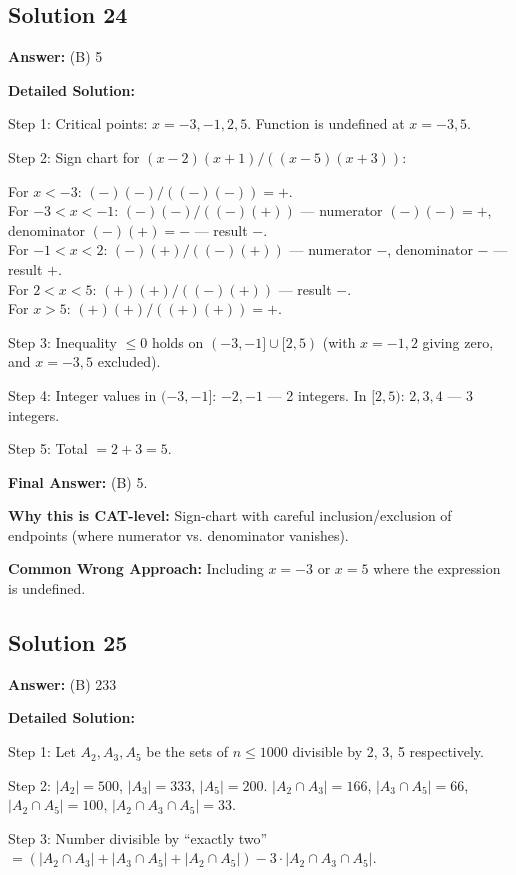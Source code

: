 \documentclass[11pt]{article}
\begin{document}
\subsection*{Solution 24}
\textbf{Answer:} (B) 5

\textbf{Detailed Solution:}

Step 1: Critical points: $x = -3, -1, 2, 5$. Function is undefined at $x = -3, 5$.

Step 2: Sign chart for $(x-2)(x+1)/((x-5)(x+3))$:

For $x < -3$: $(-)(-)/((-)(-)) = +$. \\
For $-3 < x < -1$: $(-)(-)/((-)(+))$ — numerator $(-)(-) = +$, denominator $(-)(+) = -$ — result $-$. \\
For $-1 < x < 2$: $(-)(+)/((-)(+))$ — numerator $-$, denominator $-$ — result $+$. \\
For $2 < x < 5$: $(+)(+)/((-)(+))$ — result $-$. \\
For $x > 5$: $(+)(+)/((+)(+)) = +$.

Step 3: Inequality $\le 0$ holds on $(-3, -1] \cup [2, 5)$ (with $x = -1, 2$ giving zero, and $x = -3, 5$ excluded).

Step 4: Integer values in $(-3, -1]$: $-2, -1$ — 2 integers. In $[2, 5)$: $2, 3, 4$ — 3 integers.

Step 5: Total $= 2 + 3 = 5$.

\textbf{Final Answer:} (B) 5.

\textbf{Why this is CAT-level:} Sign-chart with careful inclusion/exclusion of endpoints (where numerator vs. denominator vanishes).

\textbf{Common Wrong Approach:} Including $x = -3$ or $x = 5$ where the expression is undefined.

\subsection*{Solution 25}
\textbf{Answer:} (B) 233

\textbf{Detailed Solution:}

Step 1: Let $A_2, A_3, A_5$ be the sets of $n \le 1000$ divisible by 2, 3, 5 respectively.

Step 2: $|A_2| = 500$, $|A_3| = 333$, $|A_5| = 200$. $|A_2 \cap A_3| = 166$, $|A_3 \cap A_5| = 66$, $|A_2 \cap A_5| = 100$, $|A_2 \cap A_3 \cap A_5| = 33$.

Step 3: Number divisible by ``exactly two'' $= (|A_2 \cap A_3| + |A_3 \cap A_5| + |A_2 \cap A_5|) - 3 \cdot |A_2 \cap A_3 \cap A_5|$.
\end{document}
